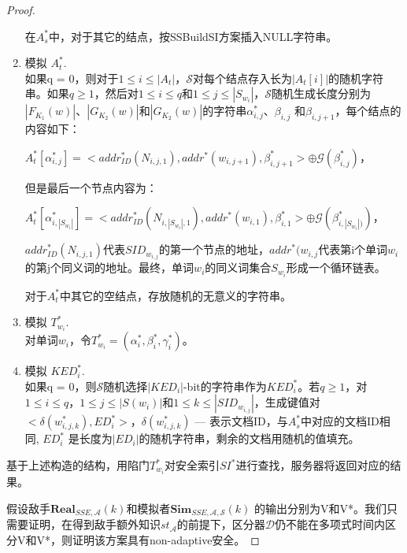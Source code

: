 \begin{thm}
\begin{proof}
\begin{enumerate}
  在$A_s^*$中，对于其它的结点，按SSBuildSI方案插入NULL字符串。
  \item 模拟 $A_t^*$. \\
  如果q = 0，则对于$1 \leq i \leq |A_t|$，$\mathcal{S}$对每个结点存入长为$|A_t[i]|$的随机字符串。如果$q \geq 1$，然后对$1 \leq i \leq q$和$1 \leq j \leq |S_{w_i}|$，$\mathcal{S}$随机生成长度分别为$|F_{K_1}(w)|$、$|G_{K_2}(w)|$和$|G_{K_2}(w)|$的字符串$\alpha_{i,j}^*$、$\beta_{i,j}$ 和$\beta_{i,j+1}$，每个结点的内容如下：
  \begin{center}
  $A_t^*[\alpha_{i,j}^*] = <addr_{ID}^*(N_{i,j,1}), addr^*(w_{i,j+1}), \beta_{i,j+1}^*> \oplus \mathcal{G}(\beta_{i,j}^*)$，
  \end{center}
  但是最后一个节点内容为：
  \begin{center}
  $A_t^*[\alpha_{i,|S_{w_i}|}^*] = <addr_{ID}^*(N_{i,|S_{w_i}|,1}), addr^*(w_{i,1}), \beta_{i,1}^*> \oplus \mathcal{G}(\beta_{i,|S_{w_i}|)}^*) $，
  \end{center}
  $addr_{ID}^*(N_{i,j,1})$代表$SID_{w_{i,j}}$的第一个节点的地址，$addr^*(w_{i,j}$代表第i个单词$w_i$的第j个同义词的地址。最终，单词$w_i$的同义词集合$S_{w_i}$形成一个循环链表。

  对于$A_t^*$中其它的空结点，存放随机的无意义的字符串。

  \item 模拟 $T_{w_i}^*$. \\
  对单词$w_i$，令$T_{w_i}^* = (\alpha_i^*, \beta_i^*, \gamma_i^*)$。

  \item 模拟 $KED_i^*$. \\
  如果q = 0，则$\mathcal{S}$随机选择$|KED_i|$-bit的字符串作为$KED_i^*$。若$q \geq 1$，对$1 \leq i \leq q$，$1 \leq j \leq |S(w_i)|$和$1 \leq k \leq |SID_{w_{i,j}}|$，生成键值对$<\delta(w_{i,j,k}^*) , ED_i^*>$，$\delta(w_{i,j,k}^*)$  --- 表示文档ID，与$A_s^*$中对应的文档ID相同, $ED_i^*$ 是长度为$|ED_i|$的随机字符串，剩余的文档用随机的值填充。
\end{enumerate}

基于上述构造的结构，用陷门$T_{w_i}^*$对安全索引$SI^*$进行查找，服务器将返回对应的结果。

假设敌手$\textbf{Real}_{SSE,\mathcal{A}}(k)$和模拟者$\textbf{Sim}_{SSE,\mathcal{A},\mathcal{S}}(k)$ 的输出分别为V和V*。我们只需要证明，在得到敌手额外知识$st_{\mathcal{A}}$的前提下，区分器$\mathcal{D}$仍不能在多项式时间内区分V和V*，则证明该方案具有non-adaptive安全。


\end{proof}
\end{thm}
